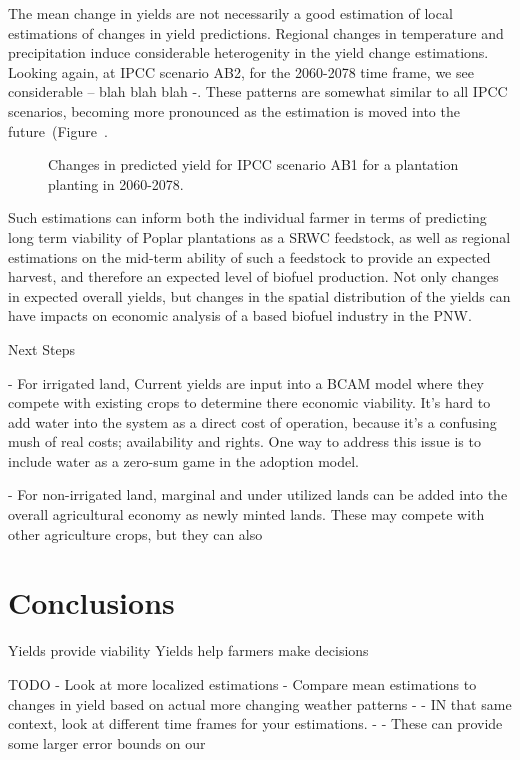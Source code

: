 \documentclass[preprint,12pt]{elsarticle}
\begin{document}
The mean change in yields are not necessarily a good estimation of
local estimations of changes in yield predictions.  Regional changes
in temperature and precipitation induce considerable heterogenity in
the yield change estimations.  Looking again, at \ac{IPCC} scenario
\ac{AB2}, for the 2060-2078 time frame, we see considerable -- blah
blah blah -.  These patterns are somewhat similar to all \ac{IPCC}
scenarios, becoming more pronounced as the estimation is moved into
the future~(Figure~\cite{fig:new-change}.

\begin{figure}[hp]
  \centering
  
  \caption{Changes in predicted yield for \ac{IPCC} scenario \ac{AB1}
    for a plantation planting in 2060-2078.}
  \label{fig:land}
\end{figure}

Such estimations can inform both the individual farmer in terms of
predicting long term viability of Poplar plantations as a \ac{SRWC}
feedstock, as well as regional estimations on the mid-term ability of
such a feedstock to provide an expected harvest, and therefore an
expected level of biofuel production.  Not only changes in expected
overall yields, but changes in the spatial distribution of the yields
can have impacts on economic analysis of a  based biofuel
industry in the \ac{PNW}.  

Next Steps 

- For irrigated land, Current yields are input into a \ac{BCAM} model
where they compete with existing crops to determine there economic
viability.  It's hard to add water into the system as a direct cost of
operation, because it's a confusing mush of real costs; availability
and rights.  One way to address this issue is to include water as a
zero-sum game in the adoption model.

- For non-irrigated land, marginal and under utilized lands can be
added into the overall agricultural economy as newly minted lands.
These may compete with other agriculture crops, but they can also 

\section{Conclusions}
\label{sec:conclude}

Yields provide viability
Yields help farmers make decisions

TODO
- Look at more localized estimations
- Compare mean estimations to changes in yield based on actual more changing weather patterns
- - IN that same context, look at different time frames for your estimations. 
- - These can provide some larger error bounds on our 
\end{document}

